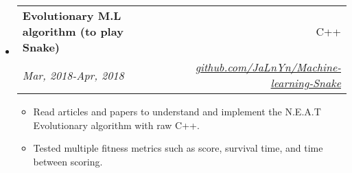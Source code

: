 \documentclass[letterpaper,12pt]{article}[leftmargin=*]
\makeatletter
\def \entryspacing {-0pt}
\newcommand{\resumeEntryStart}{\begin{itemize}[leftmargin=2.5mm]}
\newcommand{\resumeEntryEnd}{\end{itemize}\vspace{\entryspacing}}
\newcommand{\resumeItemListStart}{\begin{itemize}[leftmargin=4.5mm]}
\newcommand{\resumeItemListEnd}{\end{itemize}}
\newcommand{\resumeItem}[1]{
  \item\small{
    {#1 \vspace{-2pt}}
  }
}
\newcommand{\resumeEntryTSDL}[4]{
  \vspace{-1pt}\item[]
    \begin{tabularx}{0.97\textwidth}{X@{\hspace{60pt}}r}
      \textbf{\color{primary}#1} & {\firabook\color{accent}\small#2} \\
      \textit{\color{accent}\small#3} & \textit{\color{accent}\small#4} \\
    \end{tabularx}\vspace{-6pt}
}
\makeatother
\begin{document}

  \resumeEntryStart
    \resumeEntryTSDL
      {Evolutionary M.L algorithm (to play Snake)}{C++}{Mar, 2018-Apr, 2018}{\href{https://github.com/JaLnYn/Machine-learning-Snake/tree/master/mlGame}{github.com/JaLnYn/Machine-learning-Snake}}
    \resumeItemListStart
	  \resumeItem {Read articles and papers to understand and implement the N.E.A.T Evolutionary algorithm with raw C++.}
      \resumeItem {Tested multiple fitness metrics such as score, survival time, and time between scoring. }
    \resumeItemListEnd
  \resumeEntryEnd

    
  
 
\end{document}

